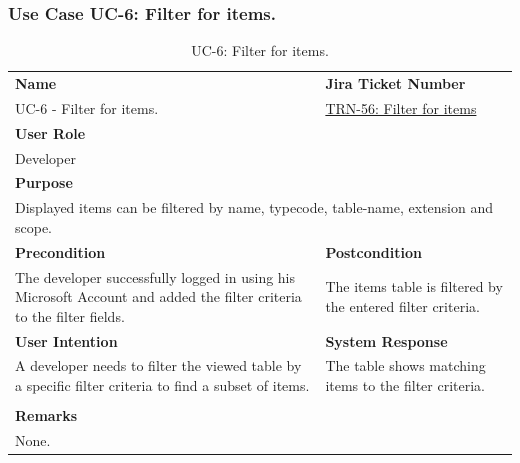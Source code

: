 \subsubsection{Use Case UC-6: Filter for items.}\label{subsubsec:use-case-uc-5:-filter-for-items}

\begin{table}[H]
    \centering
    \begin{tabular}{|p{}|p{}|}

        \hline
        \rowcolor{gray!50}\textbf{Name} & \rowcolor{gray!50}\textbf{Jira Ticket Number} \\
        UC-6 - Filter for items.
        &
        \href{https://fh-burgenland.atlassian.net/browse/TRN-56}{TRN-56: Filter for items} \\ \hline

        \multicolumn{2}{|l|}{\rowcolor{gray!50}\textbf{User Role}} \\
        \multicolumn{2}{|l|}{Developer} \\ \hline

        \multicolumn{2}{|l|}{\rowcolor{gray!50}\textbf{Purpose}} \\
        \multicolumn{2}{|l|}{Displayed items can be filtered by name, typecode, table-name, extension and scope.} \\ \hline

        \rowcolor{gray!50}\textbf{Precondition} & \rowcolor{gray!50}\textbf{Postcondition} \\
        The developer successfully logged in using his Microsoft Account and added the filter criteria to the filter fields.
        &
        The items table is filtered by the entered filter criteria.\\ \hline

        \rowcolor{gray!50}\textbf{User Intention} & \rowcolor{gray!50}\textbf{System Response} \\
        A developer needs to filter the viewed table by a specific filter criteria  to find a subset of items.
        &
        The table shows matching items to the filter criteria. \\ \hline

        & \\ \hline

        \multicolumn{2}{|l|}{\rowcolor{gray!50}\textbf{Remarks}} \\
        \multicolumn{2}{|p{1\textwidth}|}{None.} \\ \hline
    \end{tabular}
    \caption{UC-6: Filter for items.}
    \label{tab:uc-filter-for-items}
\end{table}

